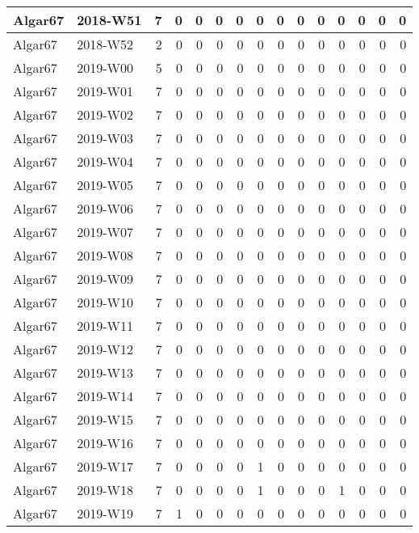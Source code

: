 \documentclass[]{book}
\begin{document}
\begin{table}
\begin{tabular}[t]{l|l|r|r|r|r|r|r|r|r|r|r|r|r|r}
\hline
Algar67 & 2018-W51 & 7 & 0 & 0 & 0 & 0 & 0 & 0 & 0 & 0 & 0 & 0 & 0 & 0\\
\hline
Algar67 & 2018-W52 & 2 & 0 & 0 & 0 & 0 & 0 & 0 & 0 & 0 & 0 & 0 & 0 & 0\\
\hline
Algar67 & 2019-W00 & 5 & 0 & 0 & 0 & 0 & 0 & 0 & 0 & 0 & 0 & 0 & 0 & 0\\
\hline
Algar67 & 2019-W01 & 7 & 0 & 0 & 0 & 0 & 0 & 0 & 0 & 0 & 0 & 0 & 0 & 0\\
\hline
Algar67 & 2019-W02 & 7 & 0 & 0 & 0 & 0 & 0 & 0 & 0 & 0 & 0 & 0 & 0 & 0\\
\hline
Algar67 & 2019-W03 & 7 & 0 & 0 & 0 & 0 & 0 & 0 & 0 & 0 & 0 & 0 & 0 & 0\\
\hline
Algar67 & 2019-W04 & 7 & 0 & 0 & 0 & 0 & 0 & 0 & 0 & 0 & 0 & 0 & 0 & 0\\
\hline
Algar67 & 2019-W05 & 7 & 0 & 0 & 0 & 0 & 0 & 0 & 0 & 0 & 0 & 0 & 0 & 0\\
\hline
Algar67 & 2019-W06 & 7 & 0 & 0 & 0 & 0 & 0 & 0 & 0 & 0 & 0 & 0 & 0 & 0\\
\hline
Algar67 & 2019-W07 & 7 & 0 & 0 & 0 & 0 & 0 & 0 & 0 & 0 & 0 & 0 & 0 & 0\\
\hline
Algar67 & 2019-W08 & 7 & 0 & 0 & 0 & 0 & 0 & 0 & 0 & 0 & 0 & 0 & 0 & 0\\
\hline
Algar67 & 2019-W09 & 7 & 0 & 0 & 0 & 0 & 0 & 0 & 0 & 0 & 0 & 0 & 0 & 0\\
\hline
Algar67 & 2019-W10 & 7 & 0 & 0 & 0 & 0 & 0 & 0 & 0 & 0 & 0 & 0 & 0 & 0\\
\hline
Algar67 & 2019-W11 & 7 & 0 & 0 & 0 & 0 & 0 & 0 & 0 & 0 & 0 & 0 & 0 & 0\\
\hline
Algar67 & 2019-W12 & 7 & 0 & 0 & 0 & 0 & 0 & 0 & 0 & 0 & 0 & 0 & 0 & 0\\
\hline
Algar67 & 2019-W13 & 7 & 0 & 0 & 0 & 0 & 0 & 0 & 0 & 0 & 0 & 0 & 0 & 0\\
\hline
Algar67 & 2019-W14 & 7 & 0 & 0 & 0 & 0 & 0 & 0 & 0 & 0 & 0 & 0 & 0 & 0\\
\hline
Algar67 & 2019-W15 & 7 & 0 & 0 & 0 & 0 & 0 & 0 & 0 & 0 & 0 & 0 & 0 & 0\\
\hline
Algar67 & 2019-W16 & 7 & 0 & 0 & 0 & 0 & 0 & 0 & 0 & 0 & 0 & 0 & 0 & 0\\
\hline
Algar67 & 2019-W17 & 7 & 0 & 0 & 0 & 0 & 1 & 0 & 0 & 0 & 0 & 0 & 0 & 0\\
\hline
Algar67 & 2019-W18 & 7 & 0 & 0 & 0 & 0 & 1 & 0 & 0 & 0 & 1 & 0 & 0 & 0\\
\hline
Algar67 & 2019-W19 & 7 & 1 & 0 & 0 & 0 & 0 & 0 & 0 & 0 & 0 & 0 & 0 & 0\\

\end{tabular}
\end{table}
\end{document}
